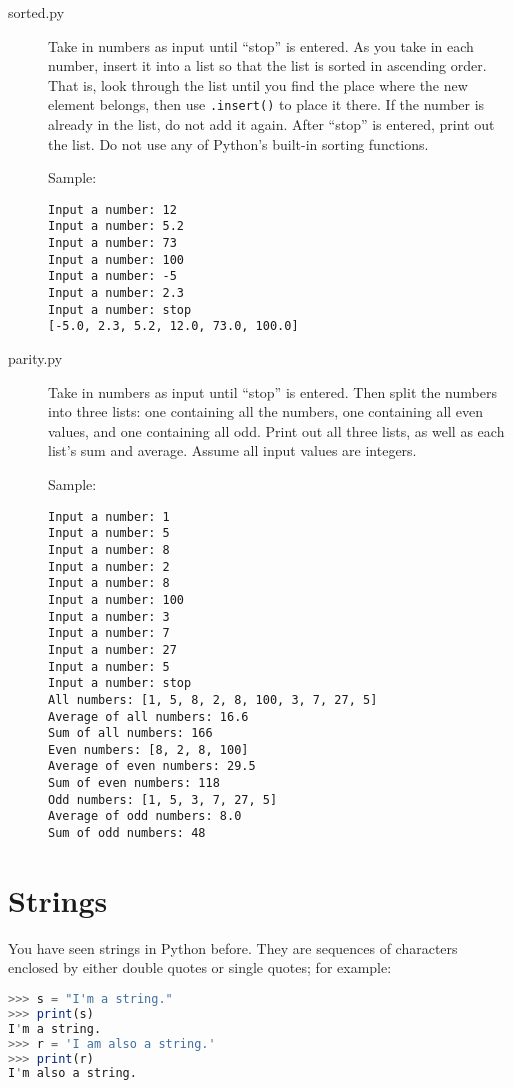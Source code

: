 \documentclass[11pt]{cselabheader}
\begin{document}
\begin{description}
  \item[sorted.py] Take in numbers as input until ``stop'' is entered. As you take in each number, insert it into a list so that the list is sorted in ascending order. That is, look through the list until you find the place where the new element belongs, then use \lstinline{.insert()} to place it there. If the number is already in the list, do not add it again. After ``stop'' is entered, print out the list. Do not use any of Python's built-in sorting functions.

    Sample:
\begin{lstlisting}[style=ipython]
Input a number: 12
Input a number: 5.2
Input a number: 73
Input a number: 100
Input a number: -5
Input a number: 2.3
Input a number: stop
[-5.0, 2.3, 5.2, 12.0, 73.0, 100.0]
\end{lstlisting}

  \item[parity.py] Take in numbers as input until ``stop'' is entered. Then split the numbers into three lists: one containing all the numbers, one containing all even values, and one containing all odd. Print out all three lists, as well as each list's sum and average. Assume all input values are integers.

    Sample:
\begin{lstlisting}[style=ipython]
Input a number: 1
Input a number: 5
Input a number: 8
Input a number: 2
Input a number: 8
Input a number: 100
Input a number: 3
Input a number: 7
Input a number: 27
Input a number: 5
Input a number: stop
All numbers: [1, 5, 8, 2, 8, 100, 3, 7, 27, 5]
Average of all numbers: 16.6
Sum of all numbers: 166
Even numbers: [8, 2, 8, 100]
Average of even numbers: 29.5
Sum of even numbers: 118
Odd numbers: [1, 5, 3, 7, 27, 5]
Average of odd numbers: 8.0
Sum of odd numbers: 48
\end{lstlisting}
\end{description}


\section{Strings}

You have seen strings in Python before. They are sequences of characters
enclosed by either double quotes or single quotes; for example:
\begin{lstlisting}[style=ipython,language=Octave] % string escaping issues with Python style
>>> s = "I'm a string."
>>> print(s)
I'm a string.
>>> r = 'I am also a string.'
>>> print(r)
I'm also a string.
\end{lstlisting}
\end{document}
